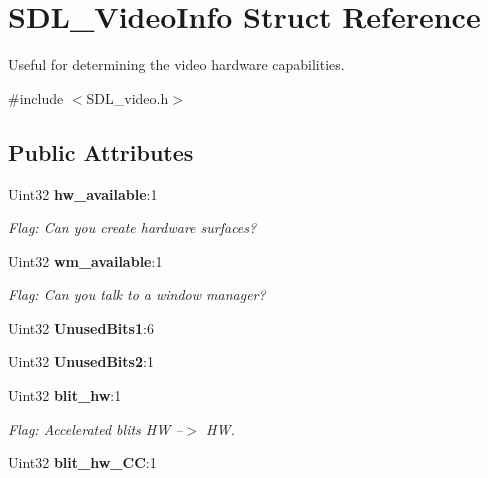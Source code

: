 \section{S\+D\+L\+\_\+\+Video\+Info Struct Reference}
\label{struct_s_d_l___video_info}


Useful for determining the video hardware capabilities.  




{\ttfamily \#include $<$S\+D\+L\+\_\+video.\+h$>$}

\subsection*{Public Attributes}
\begin{DoxyCompactItemize}
\item 
Uint32 {\bf hw\+\_\+available}\+:1\label{struct_s_d_l___video_info_a515e38f0a122a45fe67230e3929670f5}

\begin{DoxyCompactList}\small\item\em Flag\+: Can you create hardware surfaces? \end{DoxyCompactList}\item 
Uint32 {\bf wm\+\_\+available}\+:1\label{struct_s_d_l___video_info_aa7dee6b91b73acd0476d67d7036669e9}

\begin{DoxyCompactList}\small\item\em Flag\+: Can you talk to a window manager? \end{DoxyCompactList}\item 
Uint32 {\bfseries Unused\+Bits1}\+:6\label{struct_s_d_l___video_info_a1aeb1f930953b9d32a56f978047b5f27}

\item 
Uint32 {\bfseries Unused\+Bits2}\+:1\label{struct_s_d_l___video_info_add1b831a063c0a4aed3f2f496096374b}

\item 
Uint32 {\bf blit\+\_\+hw}\+:1\label{struct_s_d_l___video_info_afd985d7ee038d978694ebe0203338837}

\begin{DoxyCompactList}\small\item\em Flag\+: Accelerated blits H\+W --$>$ H\+W. \end{DoxyCompactList}\item 
Uint32 {\bf blit\+\_\+hw\+\_\+\+C\+C}\+:1\label{struct_s_d_l___video_info_af62ba97a72e925000dde2ea27c854b7f}


\end{DoxyCompactItemize}

